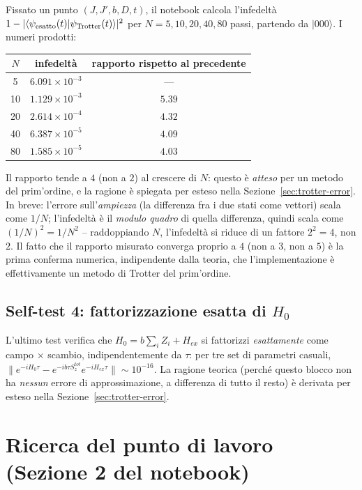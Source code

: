 \documentclass[11pt,a4paper]{article}
\newcommand{\ket}[1]{\lvert #1 \rangle}
\begin{document}
Fissato un punto $(J,J',b,D,t)$, il notebook calcola l'infedeltà
$1-|\langle\psi_{\rm esatto}(t)|\psi_{\rm Trotter}(t)\rangle|^2$ per
$N=5,10,20,40,80$ passi, partendo da $\ket{000}$. I numeri prodotti:
\begin{center}
\begin{tabular}{@{}ccc@{}}
\toprule
$N$ & infedeltà & rapporto rispetto al precedente \\
\midrule
5 & $6.091\times10^{-3}$ & --- \\
10 & $1.129\times10^{-3}$ & $5.39$ \\
20 & $2.614\times10^{-4}$ & $4.32$ \\
40 & $6.387\times10^{-5}$ & $4.09$ \\
80 & $1.585\times10^{-5}$ & $4.03$ \\
\bottomrule
\end{tabular}
\end{center}
Il rapporto tende a $4$ (non a $2$) al crescere di $N$: questo è
\emph{atteso} per un metodo del prim'ordine, e la ragione è spiegata per
esteso nella Sezione~\ref{sec:trotter-error}. In breve: l'errore
sull'\emph{ampiezza} (la differenza fra i due stati come vettori) scala
come $1/N$; l'infedeltà è il \emph{modulo quadro} di quella differenza,
quindi scala come $(1/N)^2=1/N^2$ -- raddoppiando $N$, l'infedeltà si
riduce di un fattore $2^2=4$, non $2$. Il fatto che il rapporto misurato
converga proprio a $4$ (non a $3$, non a $5$) è la prima conferma
numerica, indipendente dalla teoria, che l'implementazione è
effettivamente un metodo di Trotter del prim'ordine.

\subsection{Self-test 4: fattorizzazione esatta di $H_0$}

L'ultimo test verifica che $H_0=b\sum_iZ_i+H_{ex}$ si fattorizzi
\emph{esattamente} come campo $\times$ scambio, indipendentemente da
$\tau$: per tre set di parametri casuali, $\|e^{-iH_0\tau} -
e^{-ib\tau S_z^{tot}}e^{-iH_{ex}\tau}\|\sim10^{-16}$. La ragione teorica
(perché questo blocco non ha \emph{nessun} errore di approssimazione, a
differenza di tutto il resto) è derivata per esteso nella
Sezione~\ref{sec:trotter-error}.

\section{Ricerca del punto di lavoro (Sezione 2 del notebook)}
\label{sec:ricerca-punto}
\end{document}
